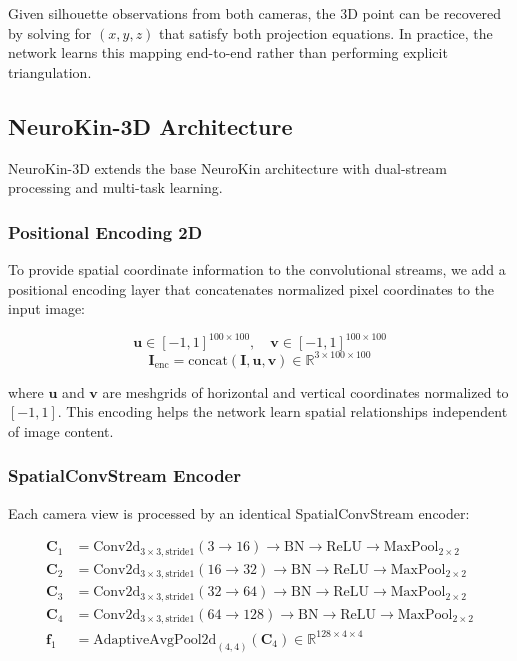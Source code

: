 ﻿\documentclass[12pt,a4paper,oneside]{report}
\begin{document}
Given silhouette observations from both cameras, the 3D point can be recovered by solving for $(x, y, z)$ that satisfy both projection equations. In practice, the network learns this mapping end-to-end rather than performing explicit triangulation.

\subsection{NeuroKin-3D Architecture}

NeuroKin-3D extends the base NeuroKin architecture with dual-stream processing and multi-task learning.

\subsubsection{Positional Encoding 2D}

To provide spatial coordinate information to the convolutional streams, we add a positional encoding layer that concatenates normalized pixel coordinates to the input image:

\begin{equation}
\mathbf{u} \in [-1, 1]^{100 \times 100}, \quad \mathbf{v} \in [-1, 1]^{100 \times 100}
\end{equation}
\begin{equation}
\mathbf{I}_{\text{enc}} = \text{concat}(\mathbf{I}, \mathbf{u}, \mathbf{v}) \in \mathbb{R}^{3 \times 100 \times 100}
\end{equation}

where $\mathbf{u}$ and $\mathbf{v}$ are meshgrids of horizontal and vertical coordinates normalized to $[-1, 1]$. This encoding helps the network learn spatial relationships independent of image content.

\subsubsection{SpatialConvStream Encoder}

Each camera view is processed by an identical SpatialConvStream encoder:

\begin{align}
\mathbf{C}_1 &= \text{Conv2d}_{3\times3,\text{stride}1}(3 \rightarrow 16) \rightarrow \text{BN} \rightarrow \text{ReLU} \rightarrow \text{MaxPool}_{2\times2} \\
\mathbf{C}_2 &= \text{Conv2d}_{3\times3,\text{stride}1}(16 \rightarrow 32) \rightarrow \text{BN} \rightarrow \text{ReLU} \rightarrow \text{MaxPool}_{2\times2} \\
\mathbf{C}_3 &= \text{Conv2d}_{3\times3,\text{stride}1}(32 \rightarrow 64) \rightarrow \text{BN} \rightarrow \text{ReLU} \rightarrow \text{MaxPool}_{2\times2} \\
\mathbf{C}_4 &= \text{Conv2d}_{3\times3,\text{stride}1}(64 \rightarrow 128) \rightarrow \text{BN} \rightarrow \text{ReLU} \rightarrow \text{MaxPool}_{2\times2} \\
\mathbf{f}_1 &= \text{AdaptiveAvgPool2d}_{(4,4)}(\mathbf{C}_4) \in \mathbb{R}^{128 \times 4 \times 4}
\end{align}
\end{document}
